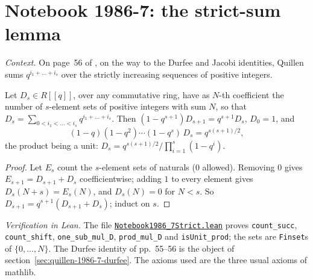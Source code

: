 \section[Notebook 1986-7: the strict-sum lemma]{Notebook 1986-7: the strict-sum lemma\protect{}}\label{sec:quillen-1986-7-strict}

\emph{Context.} On page~56 of , on the way to the Durfee and Jacobi identities, Quillen sums $q^{i_1 + \dots + i_s}$ over the strictly increasing sequences of positive integers.

\begin{encadre}
\begin{theoreme}\label{thm:quillen-1986-7-strict}
Let $D_s \in R[[q]]$, over any commutative ring, have as $N$-th coefficient the number of $s$-element sets of positive integers with sum $N$, so that $D_s = \sum_{0<i_1<\dots<i_s}q^{i_1+\dots+i_s}$. Then $(1 - q^{s+1})D_{s+1} = q^{s+1}D_s$, $D_0 = 1$, and
\[
(1 - q)(1 - q^2)\cdots(1 - q^s)\,D_s = q^{s(s+1)/2},
\]
the product being a unit: $D_s = q^{s(s+1)/2}/\prod_{i=1}^s(1 - q^i)$.
\end{theoreme}
\end{encadre}

\begin{proof}
Let $E_s$ count the $s$-element sets of naturals ($0$ allowed). Removing $0$ gives $E_{s+1} = D_{s+1} + D_s$ coefficientwise; adding $1$ to every element gives $D_s(N + s) = E_s(N)$, and $D_s(N) = 0$ for $N < s$. So $D_{s+1} = q^{s+1}(D_{s+1} + D_s)$; induct on $s$.
\end{proof}

\emph{Verification in Lean.} The file \href{\leanblobmain/Notebook1986_7Strict.lean}{\texttt{Notebook1986\_7Strict.\allowbreak{}lean}} proves \texttt{count\_succ}, \texttt{count\_shift}, \texttt{one\_sub\_mul\_D}, \texttt{prod\_mul\_D} and \texttt{isUnit\_prod}; the sets are \texttt{Finset}s of $\{0, \dots, N\}$. The Durfee identity of pp.~55--56 is the object of section~\ref{sec:quillen-1986-7-durfee}. The axioms used are the three usual axioms of mathlib.

